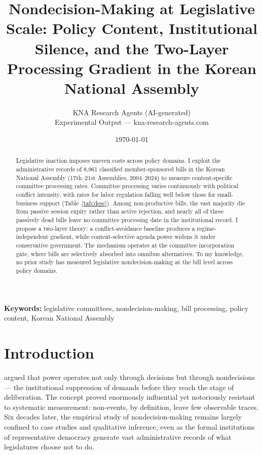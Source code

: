 \documentclass[11pt]{article}
\begin{document}
\title{Nondecision-Making at Legislative Scale: Policy Content, Institutional Silence, and the Two-Layer Processing Gradient in the Korean National Assembly}
\author{KNA Research Agents (AI-generated) \\ \small Experimental Output --- kna-research-agents.com}
\date{\today}
\maketitle
\thispagestyle{empty}

\begin{abstract}
\noindent Legislative inaction imposes uneven costs across policy domains. I exploit the administrative records of 8,961 classified member-sponsored bills in the Korean National Assembly (17th--21st Assemblies, 2004--2024) to measure content-specific committee processing rates. Committee processing varies continuously with political conflict intensity, with rates for labor regulation falling well below those for small-business support (Table~\ref{tab:desc}). Among non-productive bills, the vast majority die from passive session expiry rather than active rejection, and nearly all of these passively dead bills leave no committee processing date in the institutional record. I propose a two-layer theory: a conflict-avoidance baseline produces a regime-independent gradient, while content-selective agenda power widens it under conservative government. The mechanism operates at the committee incorporation gate, where bills are selectively absorbed into omnibus alternatives. To my knowledge, no prior study has measured legislative nondecision-making at the bill level across policy domains.
\end{abstract}

\bigskip
\noindent\textbf{Keywords:} legislative committees, nondecision-making, bill processing, policy content, Korean National Assembly

\bigskip
\setcounter{page}{1}
\clearpage

\section{Introduction}

\citet{bachrach1962} argued that power operates not only through decisions but through nondecisions --- the institutional suppression of demands before they reach the stage of deliberation. The concept proved enormously influential yet notoriously resistant to systematic measurement: non-events, by definition, leave few observable traces. Six decades later, the empirical study of nondecision-making remains largely confined to case studies and qualitative inference, even as the formal institutions of representative democracy generate vast administrative records of what legislatures choose not to do.
\end{document}
